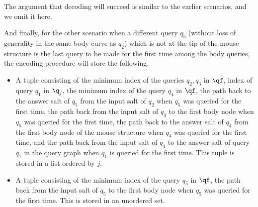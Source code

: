 {The argument that decoding will succeed is similar to the earlier scenarios, and we omit it here.

And finally, for the other scenario when a different query $q_5$ (without loss of generality in the same body curve as $q_2$) which is not at the tip of the mouse structure is the last query to be made for the first time among the body queries, the encoding procedure will store the following.

\begin{itemize}
  \item A tuple consisting of the minimum index of the queries $q_2,q_3$ in $\qf$, index of query $q_1$ in $\q_j$, the minimum index of the query $q_4$ in $\qf$, the path back to the answer salt of $q_5$ from the input salt of $q_2$ when $q_5$ was queried for the first time, the path back from the input salt of $q_3$ to the first body node when $q_5$ was queried for the first time, the path back to the answer salt of $q_4$ from the first body node of the mouse structure when $q_4$ was queried for the first time, and the path back from the input salt of $q_4$ to the answer salt of query $q_1$ in the query graph when $q_1$ is queried for the first time. This tuple is stored in a list ordered by $j$.
  \item A tuple consisting of the minimum index of the query $q_5$ in $\qf$, the path back from the input salt of $q_5$ to the first body node when $q_5$ was queried for the first time. This is stored in an unordered set.

\end{itemize}}
